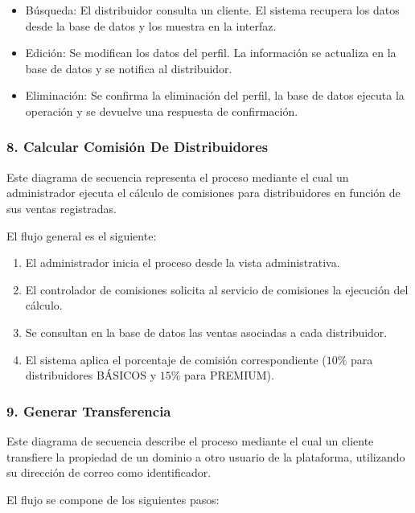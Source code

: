 \begin{itemize}
    \item Búsqueda: El distribuidor consulta un cliente. El sistema recupera los datos desde la base de datos y los muestra en la interfaz.

    \item Edición: Se modifican los datos del perfil. La información se actualiza en la base de datos y se notifica al distribuidor.

    \item Eliminación: Se confirma la eliminación del perfil, la base de datos ejecuta la operación y se devuelve una respuesta de confirmación.
\end{itemize}

\subsubsection*{8. Calcular Comisión De Distribuidores}

Este diagrama de secuencia representa el proceso mediante el cual un administrador ejecuta el cálculo de comisiones para distribuidores en función de sus ventas registradas.

El flujo general es el siguiente:

\begin{enumerate}
    \item El administrador inicia el proceso desde la vista administrativa.
    \item El controlador de comisiones solicita al servicio de comisiones la ejecución del cálculo.
    \item Se consultan en la base de datos las ventas asociadas a cada distribuidor.
    \item El sistema aplica el porcentaje de comisión correspondiente ($10\% $ para distribuidores BÁSICOS y $15\%$ para PREMIUM).
\end{enumerate}

\subsubsection*{9. Generar Transferencia}

Este diagrama de secuencia describe el proceso mediante el cual un cliente transfiere la propiedad de un dominio a otro usuario de la plataforma, utilizando su dirección de correo como identificador.

El flujo se compone de los siguientes pasos:

